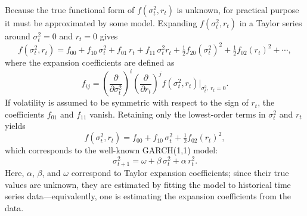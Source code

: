 \documentclass[preprints,article,accept,pdftex,oneauthor]{Definitions/mdpi}
\begin{document}
Because the true functional form of $f(\sigma_t^2, r_t)$ is unknown,
for practical purpose it must be approximated by some model. Expanding $f(\sigma_t^2, r_t)$
in a Taylor series around $\sigma_t^2 = 0$ and $r_t = 0$ gives
\begin{equation}
  f\!\left(\sigma_t^2, r_t\right)
  = f_{00}
  + f_{10}\,\sigma_t^2
  + f_{01}\,r_t
  + f_{11}\,\sigma_t^2 r_t
  + \tfrac{1}{2}f_{20}\!\left(\sigma_t^2\right)^2
  + \tfrac{1}{2}f_{02}\!\left(r_t\right)^2
  + \cdots, \label{eq:taylor}
\end{equation}
where the expansion coefficients are defined as
\begin{equation}
  f_{ij}
  = \left(\frac{\partial}{\partial\sigma_t^2}\right)^{\!i}
    \left(\frac{\partial}{\partial r_t}\right)^{\!j}
    f\!\left(\sigma_t^2, r_t\right)\bigg|_{\sigma_t^2,\,r_t=0}.
  \label{eq:taylor_coeff}
\end{equation}
If volatility is assumed to be symmetric with respect to the sign of
$r_t$, the coefficients $f_{01}$ and $f_{11}$ vanish. Retaining only
the lowest-order terms in $\sigma_t^2$ and $r_t$ yields
\begin{equation}
  f\!\left(\sigma_t^2, r_t\right)
  = f_{00} + f_{10}\,\sigma_t^2 + \tfrac{1}{2}f_{02}\!\left(r_t\right)^2,
  \label{eq:garch11_derivation}
\end{equation}
which corresponds to the well-known GARCH(1,1) model:
\begin{equation}
  \sigma_{t+1}^2 = \omega + \beta\,\sigma_t^2 + \alpha\,r_t^2.
  \label{eq:garch11}
\end{equation}
Here, $\alpha$, $\beta$, and $\omega$ correspond to Taylor expansion
coefficients; since their true values are unknown, they are estimated by
fitting the model to historical time series data---equivalently, one is
estimating the expansion coefficients from the data.
 
\end{document}
